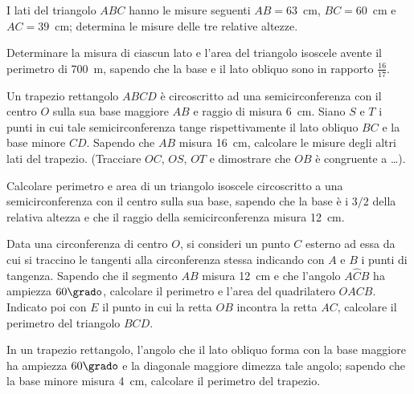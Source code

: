 \begin{multicols}{2}
\begin{esercizio}
\label{ese:7.82}
I lati del triangolo $ABC$ hanno le misure seguenti $AB=63$~cm, 
$BC=60$~cm e $AC=39$~cm; determina le misure delle tre relative 
altezze.
\end{esercizio}

\begin{esercizio}
\label{ese:7.83}
Determinare la misura di ciascun lato e l'area del triangolo isoscele 
avente il perimetro di 700~m, sapendo che la base e il lato obliquo 
sono in rapporto $\frac{16}{17}$.
\end{esercizio}

\begin{esercizio}
\label{ese:7.84}
Un trapezio rettangolo $ABCD$ è circoscritto ad una semicirconferenza 
con il centro $O$ sulla sua base maggiore $AB$ e raggio di misura 
6~cm. Siano $S$ e $T$ i punti in cui tale semicirconferenza tange 
rispettivamente il lato obliquo $BC$ e la base minore $CD$. Sapendo 
che $AB$ misura 16~cm, calcolare le misure degli altri lati del 
trapezio. (Tracciare $OC$, $OS$, $OT$ e dimostrare che $OB$ è 
congruente a \ldots{}).
\end{esercizio}

\begin{esercizio}
\label{ese:7.85}
Calcolare perimetro e area di un triangolo isoscele circoscritto a 
una semicirconferenza con il centro sulla sua base, sapendo che la 
base è i $3/2$ della relativa altezza e che il raggio della 
semicirconferenza misura 12~cm.
\end{esercizio}

\begin{esercizio}
\label{ese:7.86}
Data una circonferenza di centro $O$, si consideri un punto $C$ 
esterno ad essa da cui si traccino le tangenti alla circonferenza 
stessa indicando con $A$ e $B$ i punti di tangenza. Sapendo che il 
segmento $AB$ misura 12~cm e che l'angolo $A\widehat{C}B$ ha ampiezza 
$60\grado$, calcolare il perimetro e l'area del quadrilatero $OACB$. 
Indicato poi con $E$ il punto in cui la retta $OB$ incontra la retta 
$AC$, calcolare il perimetro del triangolo $BCD$.
\end{esercizio}

\begin{esercizio}
\label{ese:7.87}
In un trapezio rettangolo, l'angolo che il lato obliquo forma con la 
base maggiore ha ampiezza $60\grado$ e la diagonale maggiore dimezza 
tale angolo; sapendo che la base minore misura 4~cm,  calcolare il 
perimetro del trapezio.
\end{esercizio}


\end{multicols}
